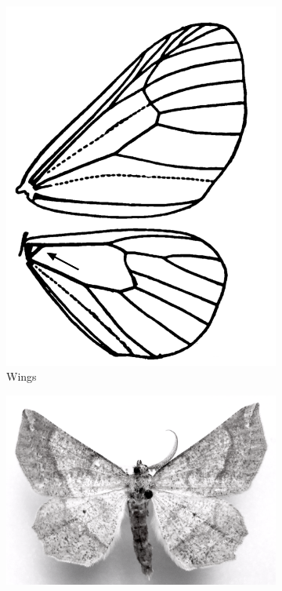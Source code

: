 \documentclass[letterpaper, 11pt]{article}
\begin{document}
\begin{figure}[ht!]
    \centering
    \begin{subfigure}[ht!]{0.3\textwidth}
        \includegraphics[width=\textwidth]{GeometridWings}
        \caption{Wings \citep[][Fig. 20]{comstock1893evolution}}
        \label{fig:geometrid1}
    \end{subfigure}
    \hfill %
    \begin{subfigure}[ht!]{0.57\textwidth}
        \includegraphics[width=\textwidth]{geometridHab.png}

\end{subfigure}
\end{figure}
\end{document}
